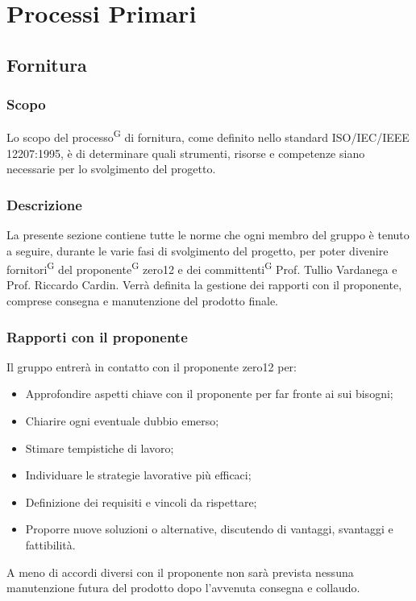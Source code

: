 \section{Processi Primari}
\subsection{Fornitura}
\subsubsection{Scopo}
Lo scopo del processo\textsuperscript{G} di fornitura, come definito nello standard ISO/IEC/IEEE 12207:1995, è di determinare quali strumenti, risorse e competenze siano necessarie per lo svolgimento del progetto. 

\subsubsection{Descrizione}
La presente sezione contiene tutte le norme che ogni membro del gruppo è tenuto a seguire, durante le varie fasi di svolgimento del progetto, per poter divenire fornitori\textsuperscript{G} del proponente\textsuperscript{G} zero12 e dei committenti\textsuperscript{G} Prof. Tullio Vardanega e Prof. Riccardo Cardin. 
Verrà definita la gestione dei rapporti con il proponente, comprese consegna e manutenzione del prodotto finale.

\subsubsection{Rapporti con il proponente}
Il gruppo entrerà in contatto con il proponente zero12 per:
\begin{itemize}
	\item Approfondire aspetti chiave con il proponente per far fronte ai sui bisogni; 
	\item Chiarire ogni eventuale dubbio emerso;
	\item Stimare tempistiche di lavoro;
	\item Individuare le strategie lavorative più efficaci;
	\item Definizione dei requisiti e vincoli da rispettare;
	\item Proporre nuove soluzioni o alternative, discutendo di vantaggi, svantaggi e fattibilità.
\end{itemize}
A meno di accordi diversi con il proponente non sarà prevista nessuna manutenzione futura del prodotto dopo l'avvenuta consegna e collaudo.

